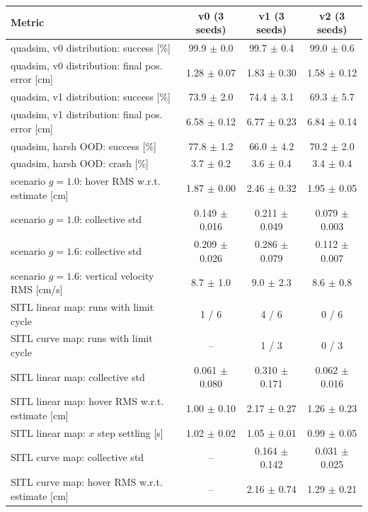 \begin{tabular}{lccc}\toprule
Metric & v0 (3 seeds) & v1 (3 seeds) & v2 (3 seeds)\\\midrule
quadsim, v0 distribution: success [\%] & 99.9 $\pm$ 0.0 & 99.7 $\pm$ 0.4 & 99.0 $\pm$ 0.6\\
quadsim, v0 distribution: final pos. error [cm] & 1.28 $\pm$ 0.07 & 1.83 $\pm$ 0.30 & 1.58 $\pm$ 0.12\\
quadsim, v1 distribution: success [\%] & 73.9 $\pm$ 2.0 & 74.4 $\pm$ 3.1 & 69.3 $\pm$ 5.7\\
quadsim, v1 distribution: final pos. error [cm] & 6.58 $\pm$ 0.12 & 6.77 $\pm$ 0.23 & 6.84 $\pm$ 0.14\\
quadsim, harsh OOD: success [\%] & 77.8 $\pm$ 1.2 & 66.0 $\pm$ 4.2 & 70.2 $\pm$ 2.0\\
quadsim, harsh OOD: crash [\%] & 3.7 $\pm$ 0.2 & 3.6 $\pm$ 0.4 & 3.4 $\pm$ 0.4\\
scenario $g=1.0$: hover RMS w.r.t. estimate [cm] & 1.87 $\pm$ 0.00 & 2.46 $\pm$ 0.32 & 1.95 $\pm$ 0.05\\
scenario $g=1.0$: collective std & 0.149 $\pm$ 0.016 & 0.211 $\pm$ 0.049 & 0.079 $\pm$ 0.003\\
scenario $g=1.6$: collective std & 0.209 $\pm$ 0.026 & 0.286 $\pm$ 0.079 & 0.112 $\pm$ 0.007\\
scenario $g=1.6$: vertical velocity RMS [cm/s] & 8.7 $\pm$ 1.0 & 9.0 $\pm$ 2.3 & 8.6 $\pm$ 0.8\\
SITL linear map: runs with limit cycle & 1 / 6 & 4 / 6 & 0 / 6\\
SITL curve map: runs with limit cycle & -- & 1 / 3 & 0 / 3\\
SITL linear map: collective std & 0.061 $\pm$ 0.080 & 0.310 $\pm$ 0.171 & 0.062 $\pm$ 0.016\\
SITL linear map: hover RMS w.r.t. estimate [cm] & 1.00 $\pm$ 0.10 & 2.17 $\pm$ 0.27 & 1.26 $\pm$ 0.23\\
SITL linear map: $x$ step settling [s] & 1.02 $\pm$ 0.02 & 1.05 $\pm$ 0.01 & 0.99 $\pm$ 0.05\\
SITL curve map: collective std & -- & 0.164 $\pm$ 0.142 & 0.031 $\pm$ 0.025\\
SITL curve map: hover RMS w.r.t. estimate [cm] & -- & 2.16 $\pm$ 0.74 & 1.29 $\pm$ 0.21\\
\bottomrule\end{tabular}
